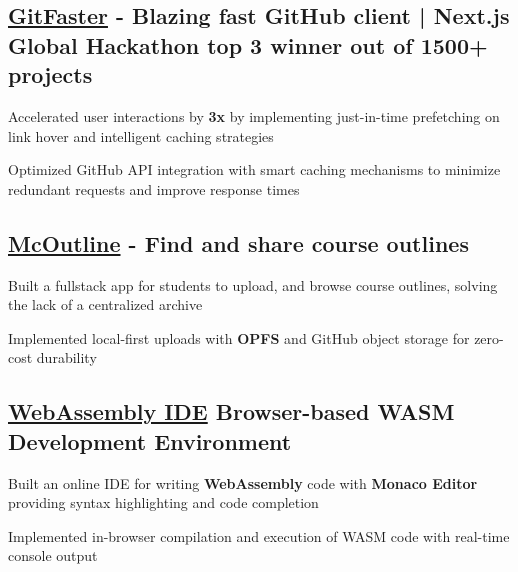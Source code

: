 \subsection{\href{https://gitfaster.dev/}{GitFaster} - Blazing fast GitHub client | \textbf{Next.js Global Hackathon top 3 winner out of 1500+ projects}}
\begin{zitemize}
    \item Accelerated user interactions by \textbf{3x} by implementing just-in-time prefetching on link hover and intelligent caching strategies
    \item Optimized GitHub API integration with smart caching mechanisms to minimize redundant requests and improve response times
\end{zitemize}

\subsection{\href{https://www.mcoutline.ca/}{McOutline} - Find and share course outlines}
\begin{zitemize}
    \item Built a fullstack app for students to upload, and browse course outlines, solving the lack of a centralized archive
    \item Implemented local-first uploads with \textbf{OPFS} and GitHub object storage for zero-cost durability
\end{zitemize}


\subsection{\href{https://wasm.arian.gg/}{WebAssembly IDE} \textbar{} Browser-based WASM Development Environment}
\begin{zitemize}
    \item Built an online IDE for writing \textbf{WebAssembly} code with \textbf{Monaco Editor} providing syntax highlighting and code completion
    \item Implemented in-browser compilation and execution of WASM code with real-time console output
\end{zitemize}


